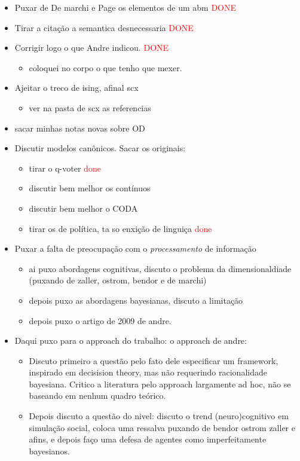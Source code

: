 \documentclass{article}
\begin{document}
\begin{itemize}
  \item Puxar de De marchi e Page os elementos de um abm \textcolor{red}{DONE}
  \item Tirar a citação a semantica desnecessaria \textcolor{red}{DONE}
  \item {\Large Corrigir logo o que Andre indicou.} \textcolor{red}{DONE}
      \begin{itemize}
      \item coloquei no corpo o que tenho que mexer.
    \end{itemize}
  \item Ajeitar o treco de ising, afinal scx   
    \begin{itemize}
    \item ver na pasta de scx as referencias
    \end{itemize}
  \item sacar minhas notas novas sobre OD
\item Discutir modelos canônicos. {\Large Sacar os originais}:
  \begin{itemize}
  \item tirar o q-voter \textcolor{red}{done}
  \item discutir bem melhor os contínuos
  \item discutir bem melhor o CODA
  \item tirar os de política, ta so enxição de linguiça \textcolor{red}{done}
  \end{itemize}

\item Puxar a falta de preocupação com o \textit{processamento} de informação
  \begin{itemize}
  \item ai puxo abordagens cognitivas, discuto o problema da dimensionaldiade
    (puxando de zaller, ostrom, bendor e de marchi)
  \item depois puxo as abordagens bayesianas, discuto a limitação
  \item depois puxo o artigo de 2009 de andre.
  \end{itemize}
  
\item Daqui puxo para o approach do trabalho: o approach de andre:
  
  \begin{itemize}
  \item Discuto primeiro a questão pelo fato dele especificar um framework,
    inspirado em decisision theory, mas não requerindo racionalidade bayesiana.
    Critico a literatura pelo approach largamente ad hoc, não se baseando em
    nenhum quadro teórico.
  \item Depois discuto a questão do nivel: discuto o trend (neuro)cognitivo em
    simulação social, coloca uma ressalva puxando de bendor ostrom zaller e
    afins, e depois faço uma defesa de agentes como imperfeitamente bayesianos.
  \end{itemize}
\end{itemize}
\end{document}
